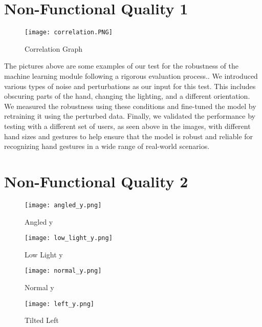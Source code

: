\documentclass[12pt, titlepage]{article}
\begin{document}
\section{Non-Functional Quality 1}	

\begin{figure}[H] 
\centering
\texttt{[image: correlation.PNG]} 
\caption{Correlation Graph} 
\label{Fig.Correlation} 
\end{figure}

The pictures above are some examples of our test for the robustness of the machine learning 
module following a rigorous evaluation process.. We introduced various types of noise and 
perturbations as our input for this test. This includes obscuring parts of the hand, changing
the lighting, and a different orientation. We measured the robustness using these conditions
and fine-tuned the model by retraining it using the perturbed data. Finally, we validated the
performance by testing with a different set of users, as seen above in the images, with different
hand sizes and gestures to help ensure that the model is robust and reliable for recognizing hand
gestures in a wide range of real-world scenarios.

\newpage
\section{Non-Functional Quality 2}

\begin{figure}[!ht]
  \texttt{[image: angled\_y.png]}
  \caption{Angled y}\label{fig:Angled y}
\endminipage\centering
{}
  \texttt{[image: low\_light\_y.png]}
  \caption{Low Light y}\label{fig:Low Light y}
\endminipage\hfill
\end{figure}

\begin{figure}[!ht]
  \texttt{[image: normal\_y.png]}
  \caption{Normal y}\label{fig:Normal y}
\endminipage\centering
{}
  \texttt{[image: left\_y.png]}
  \caption{Tilted Left}\label{fig:Tilted Left}
\endminipage\hfill
\end{figure}
\end{document}
